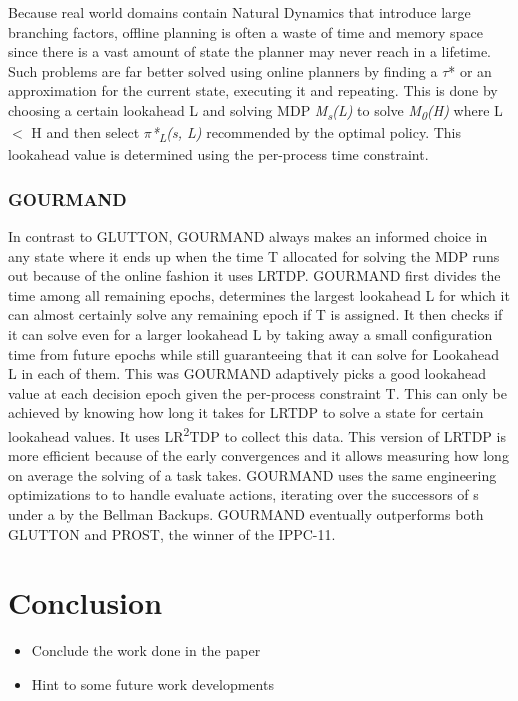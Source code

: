 \documentclass[runningheads,a4paper]{llncs}
\begin{document}
Because real world domains contain Natural Dynamics that introduce large branching factors, offline planning is often a waste of time and memory space since there is a vast amount of state the planner may never reach in a lifetime. Such problems are far better solved using online planners by finding a $\tau$* or an approximation for the current state, executing it and repeating. This is done by choosing a certain lookahead  L and solving MDP \emph{M\textsubscript{s}(L)} to solve \emph{M\textsubscript{0}(H)} where L $<$ H and then select \emph{$\pi$*\textsubscript{L}(s, L)} recommended by the optimal policy. This lookahead value is determined using the per-process time constraint.

\subsubsection{GOURMAND}
In contrast to GLUTTON, GOURMAND always makes an informed choice in any state where it ends up when the time T allocated for solving the MDP runs out because of the online fashion it uses LRTDP. GOURMAND first divides the time among all remaining epochs, determines the largest lookahead L for which it can almost certainly solve any remaining epoch if T is assigned.  It then checks if it can solve even for a larger lookahead L by taking away a small configuration time from future epochs  while still guaranteeing that it can solve for Lookahead L in each of them. This was GOURMAND adaptively picks a good lookahead value at each decision epoch given the per-process constraint T. This can only be achieved by knowing how long it takes for LRTDP to solve a state for certain lookahead values. It uses LR\textsuperscript{2}TDP to collect this data. This version of LRTDP is more efficient because of the early convergences and it allows measuring how long on average the solving of a task takes. GOURMAND uses the same engineering optimizations to to handle evaluate actions, iterating over the successors of s under a by the Bellman Backups. GOURMAND eventually outperforms both GLUTTON and PROST, the winner of the IPPC-11\cite{keller2012prost}.



\section{Conclusion}

\begin{itemize}
	\item Conclude the work done in the paper
	\item Hint to some future work developments
\end{itemize}
\end{document}
